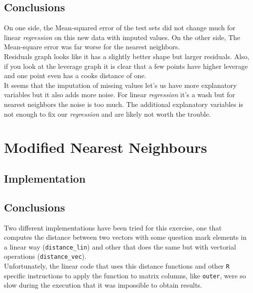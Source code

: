 \documentclass[12pt,a4paper]{article}
\begin{document}
\begin{singlespace}
\subsection{Conclusions}
On one side, the Mean-squared error of the test sets did not change much for linear \emph{regression} on this new data with imputed values. On the other side, The Mean-square error was far worse for the nearest neighbors. \\ 

Residuals graph looks like it has a slightly better shape but larger residuals. Also, if you look at the leverage graph it is clear that a few points have higher 
leverage and one point even has a cooks distance of one. \\

It seems that the imputation of missing values let's us have more explanatory variables but it also adds more noise. For linear \emph{regression} it's 
a wash but for nearest neighbors the noise is too much. The additional explanatory variables is not enough to fix our \emph{regression} and are likely not worth the trouble.



\section{Modified Nearest Neighbours}
\subsection{Implementation}


\vspace{-0.4cm}
\subsection{Conclusions}
Two different implementations have been tried for this exercise, one that computes the distance between two vectors with some question mark elements in a linear way (\texttt{distance\_lin}) and other that does the same but with vectorial operations (\texttt{distance\_vec}). \\

Unfortunately, the linear code that uses this distance functions and other \texttt{R} specific instructions to apply the function to matrix columns, like \texttt{outer}, were so slow during the execution that it was impossible to obtain results.

\end{singlespace}
\end{document}
